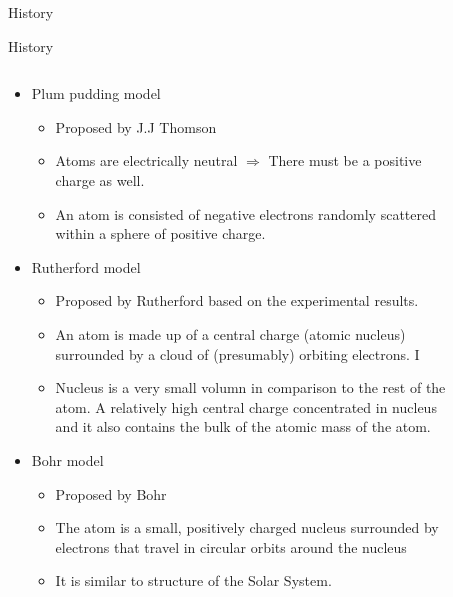 \documentclass[10pt]{beamer}
\begin{document}
{\begin{frame}{History}
\begin{figure}
    \end{figure}
\end{frame}
}

\begin{frame}{History}
    \begin{columns}
        \begin{column}{0.8\textwidth}
            \begin{itemize}
            \item Plum pudding model
            \begin{itemize}
                \item Proposed by J.J Thomson
                \item Atoms are electrically neutral $\Rightarrow$  There must be a positive charge as well.
                \item An atom is consisted of negative electrons randomly scattered within a sphere of positive charge.
            \end{itemize}
            \item Rutherford model
            \begin{itemize}
                \item Proposed by Rutherford based on the experimental results.
                \item An atom is made up of a central charge (atomic nucleus) surrounded by a cloud of (presumably) orbiting electrons. I
                \item Nucleus is a very small volumn in comparison to the rest of the atom. A relatively high central charge concentrated in nucleus and it also contains the bulk of the atomic mass of the atom.
            \end{itemize}
            \item Bohr model
            \begin{itemize}
                \item Proposed by Bohr
                \item The atom is a small, positively charged nucleus surrounded by electrons that travel in circular orbits around the nucleus 
                \item It is similar to structure of the Solar System.
            \end{itemize}
        \end{itemize}
        \end{column}
        \begin{column}{0.2\textwidth}
            \begin{figure}

\end{figure}
\end{column}
\end{columns}
\end{frame}
\end{document}
